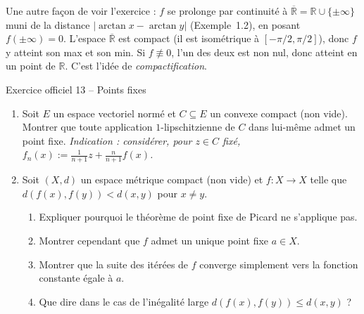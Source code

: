 \documentclass[11pt,a4paper]{article}
\newcommand{\R}{\mathbb{R}}
\newcommand{\Rb}{\overline{\R}}
\theoremstyle{definition}
\begin{document}
\begin{commentaire}
Une autre façon de voir l'exercice : $f$ se prolonge par continuité à $\Rb=\R\cup\{\pm\infty\}$ muni de la distance $|\arctan x-\arctan y|$ (Exemple~1.2), en posant $f(\pm\infty)=0$. L'espace $\Rb$ est compact (il est isométrique à $[-\pi/2,\pi/2]$), donc $f$ y atteint son max et son min. Si $f\not\equiv0$, l'un des deux est non nul, donc atteint en un point de $\R$. C'est l'idée de \emph{compactification}.
\end{commentaire}

\begin{exo}{Exercice officiel 13 -- Points fixes}
\begin{enumerate}[label=\arabic*.]
  \item Soit $E$ un espace vectoriel normé et $C\subseteq E$ un convexe compact (non vide). Montrer que toute application $1$-lipschitzienne de $C$ dans lui-même admet un point fixe. \emph{Indication : considérer, pour $z\in C$ fixé, $f_n(x):=\frac{1}{n+1}z+\frac{n}{n+1}f(x)$.}
  \item Soit $(X,d)$ un espace métrique compact (non vide) et $f:X\to X$ telle que $d(f(x),f(y))<d(x,y)$ pour $x\ne y$.
  \begin{enumerate}[label=(\alph*)]
    \item Expliquer pourquoi le théorème de point fixe de Picard ne s'applique pas.
    \item Montrer cependant que $f$ admet un unique point fixe $a\in X$.
    \item Montrer que la suite des itérées de $f$ converge simplement vers la fonction constante égale à $a$.
    \item Que dire dans le cas de l'inégalité large $d(f(x),f(y))\le d(x,y)$ ?
  \end{enumerate}
\end{enumerate}
\end{exo}
\end{document}
